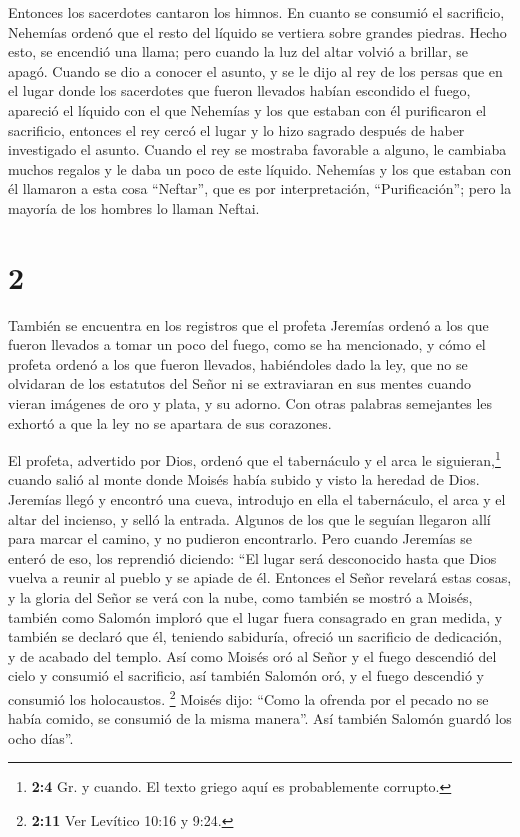  Entonces los sacerdotes cantaron los himnos.
 En cuanto se consumió el sacrificio, Nehemías ordenó que
el resto del líquido se vertiera sobre grandes piedras. 
Hecho esto, se encendió una llama; pero cuando la luz del altar volvió a
brillar, se apagó.  Cuando se dio a conocer el asunto, y
se le dijo al rey de los persas que en el lugar donde los sacerdotes que
fueron llevados habían escondido el fuego, apareció el líquido con el
que Nehemías y los que estaban con él purificaron el sacrificio,
 entonces el rey cercó el lugar y lo hizo sagrado después
de haber investigado el asunto.  Cuando el rey se
mostraba favorable a alguno, le cambiaba muchos regalos y le daba un
poco de este líquido.  Nehemías y los que estaban con él
llamaron a esta cosa ``Neftar'', que es por interpretación,
``Purificación''; pero la mayoría de los hombres lo llaman Neftai.

\hypertarget{section-1}{%
\section{2}\label{section-1}}

 También se encuentra en los registros que el profeta
Jeremías ordenó a los que fueron llevados a tomar un poco del fuego,
como se ha mencionado,  y cómo el profeta ordenó a los que
fueron llevados, habiéndoles dado la ley, que no se olvidaran de los
estatutos del Señor ni se extraviaran en sus mentes cuando vieran
imágenes de oro y plata, y su adorno.  Con otras palabras
semejantes les exhortó a que la ley no se apartara de sus corazones.

 El profeta, advertido por Dios, ordenó que el tabernáculo
y el arca le siguieran,\footnote{\textbf{2:4} Gr. y cuando. El texto
  griego aquí es probablemente corrupto.} cuando salió al monte donde
Moisés había subido y visto la heredad de Dios.  Jeremías
llegó y encontró una cueva, introdujo en ella el tabernáculo, el arca y
el altar del incienso, y selló la entrada.  Algunos de los
que le seguían llegaron allí para marcar el camino, y no pudieron
encontrarlo.  Pero cuando Jeremías se enteró de eso, los
reprendió diciendo: ``El lugar será desconocido hasta que Dios vuelva a
reunir al pueblo y se apiade de él.  Entonces el Señor
revelará estas cosas, y la gloria del Señor se verá con la nube, como
también se mostró a Moisés, también como Salomón imploró que el lugar
fuera consagrado en gran medida,  y también se declaró que
él, teniendo sabiduría, ofreció un sacrificio de dedicación, y de
acabado del templo.  Así como Moisés oró al Señor y el
fuego descendió del cielo y consumió el sacrificio, así también Salomón
oró, y el fuego descendió y consumió los holocaustos. 
\footnote{\textbf{2:11} Ver Levítico 10:16 y 9:24.} Moisés dijo: ``Como
la ofrenda por el pecado no se había comido, se consumió de la misma
manera''.  Así también Salomón guardó los ocho días''.

